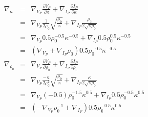 \documentclass[9pt]{beamer}
\newcommand{\partderi}[2]{\frac{\partial#1}{\partial#2}}
\begin{document}
\begin{frame}
\begin{minipage}{0.45\linewidth}
    \begin{eqnarray}
      \nabla_{\kappa} &=& \nabla_{V_P} \partderi{V_P}{\kappa} + \nabla_{I_P} \partderi{I_P}{\kappa} \nonumber\\
                      &=& \nabla_{V_P} \frac{1}{2\rho_0}\sqrt{\frac{\rho_0}{\kappa}} + \nabla_{I_P} \frac{\rho_0}{2\sqrt{\kappa\rho_0}} \nonumber\\
                      &=& \nabla_{V_P} 0.5\rho_0^{-0.5}\kappa^{-0.5} + \nabla_{I_P} 0.5\rho_0^{0.5}\kappa^{-0.5} \nonumber\\
                      &=& \left( \nabla_{V_P} + \nabla_{I_P} \rho_0 \right) 0.5\rho_0^{-0.5}\kappa^{-0.5} \nonumber\\
      \nabla_{\rho_0} &=& \nabla_{V_P} \partderi{V_P}{\rho_0} + \nabla_{I_P} \partderi{I_P}{\rho_0} \nonumber\\
                      &=& \nabla_{V_P} \frac{-\kappa}{2\rho_0^2}\sqrt{\frac{\rho_0}{\kappa}} + \nabla_{I_P} \frac{\kappa}{2\sqrt{\kappa\rho_0}} \nonumber\\
                      &=& \nabla_{V_P} (-0.5)\rho_0^{-1.5}\kappa^{0.5} + \nabla_{I_P} 0.5\rho_0^{-0.5}\kappa^{0.5} \nonumber\\
                      &=& \left(-\nabla_{V_P}\rho_0^{-1} + \nabla_{I_P} \right) 0.5\rho_0^{-0.5}\kappa^{0.5} \nonumber
    \end{eqnarray}
  \end{minipage}

\end{frame}
\end{document}
